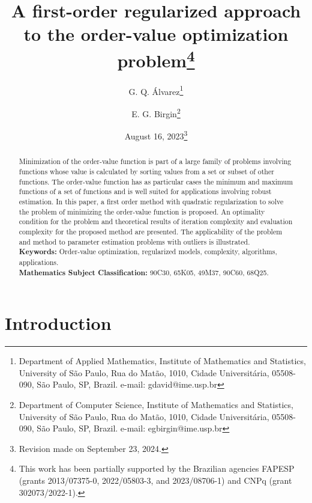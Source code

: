 \documentclass[11pt]{article}
\begin{document}
\title{A first-order regularized approach\\ to the order-value optimization problem\thanks{This work has been partially supported by the Brazilian agencies FAPESP (grants 2013/07375-0, 2022/05803-3, and 2023/08706-1) and CNPq (grant 302073/2022-1).}}

\author{
    G. Q. \'Alvarez\thanks{Department of Applied Mathematics, Institute of
    Mathematics and Statistics, University of S\~ao Paulo, Rua do
    Mat\~ao, 1010, Cidade Universit\'aria, 05508-090, S\~ao Paulo, SP,
    Brazil. e-mail: gdavid@ime.usp.br}
 \and 
    E. G. Birgin\thanks{Department of Computer Science, Institute of
    Mathematics and Statistics, University of S\~ao Paulo, Rua do
    Mat\~ao, 1010, Cidade Universit\'aria, 05508-090, S\~ao Paulo, SP,
    Brazil. e-mail: egbirgin@ime.usp.br}
}

\date{August 16, 2023\footnote{Revision made on September 23, 2024.}}

\maketitle

\begin{abstract}
Minimization of the order-value function is part of a large family of problems involving functions whose value is calculated by sorting values from a set or subset of other functions. The order-value function has as particular cases the minimum and maximum functions of a set of functions and is well suited for applications involving robust estimation. In this paper, a first order method with quadratic regularization to solve the problem of minimizing the order-value function is proposed. An optimality condition for the problem and theoretical results of iteration complexity and evaluation complexity for the proposed method are presented. The applicability of the problem and method to parameter estimation problems with outliers is illustrated.\\

\noindent
\textbf{Keywords:} Order-value optimization, regularized models, complexity, algorithms, applications.\\

\noindent
\textbf{Mathematics Subject Classification:} 90C30, 65K05, 49M37, 90C60, 68Q25.\\
\end{abstract}

\section{Introduction} \label{sec:intro}
\end{document}
